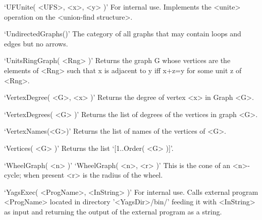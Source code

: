 `UFUnite( <UFS>, <x>, <y> )'\newline\hglue 5mm 
For  internal  use.  Implements  the  <unite> operation on the <union-find structure>.

`UndirectedGraphs()'\newline\hglue 5mm 
The category of all graphs that may contain loops and edges but no arrows.

`UnitsRingGraph( <Rng> )'\newline\hglue 5mm 
Returns  the graph G whose vertices are the elements of <Rng>  such that x
is adjacent to y iff x+z=y for some unit z of <Rng>.

`VertexDegree( <G>, <x> )'\newline\hglue 5mm 
Returns the degree of vertex <x> in Graph <G>.

`VertexDegrees( <G> )'\newline\hglue 5mm 
Returns the list of degrees of the vertices in graph <G>.

`VertexNames(<G>)'\newline\hglue 5mm 
Returns  the  list of names of the vertices of <G>.

`Vertices( <G> )'\newline\hglue 5mm 
Returns the list `[1..Order( <G> )]'.

`WheelGraph( <n> )'\newline
`WheelGraph( <n>, <r> )'\newline\hglue 5mm 
This  is  the   cone  of  an  <n>-cycle; when present <r> is the radius of the wheel.

`YagsExec( <ProgName>, <InString> )'\newline\hglue 5mm 
For  internal  use.  Calls  external  program  <ProgName> located in directory
'<YagsDir>/bin/'  feeding  it with <InString> as input and returning  the
output  of  the  external  program  as a string.

